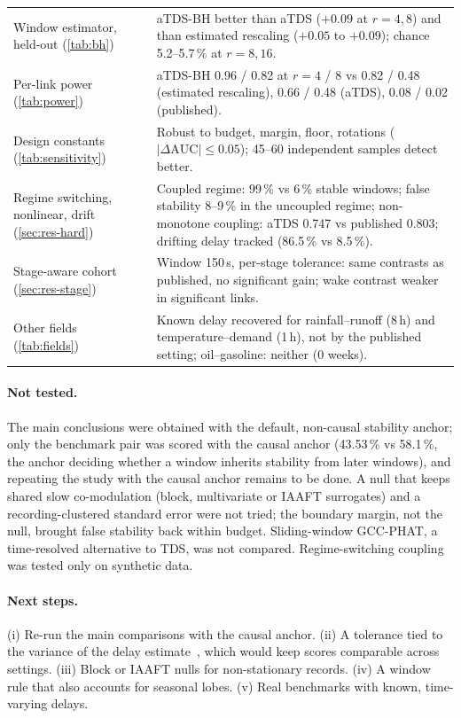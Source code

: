 \documentclass[11pt,a4paper]{article}
\begin{document}
\begin{table}[t]
\begin{tabularx}{\textwidth}{>{\raggedright\arraybackslash}p{4.2cm}>{\raggedright\arraybackslash}X}
Window estimator, held-out (\cref{tab:bh}) & aTDS-BH better than aTDS ($+0.09$ at $r = 4, 8$) and than estimated rescaling ($+0.05$ to $+0.09$); chance 5.2--5.7\,\% at $r = 8, 16$. \\
Per-link power (\cref{tab:power}) & aTDS-BH 0.96 / 0.82 at $r = 4$ / 8 vs 0.82 / 0.48 (estimated rescaling), 0.66 / 0.48 (aTDS), 0.08 / 0.02 (published). \\
Design constants (\cref{tab:sensitivity}) & Robust to budget, margin, floor, rotations ($|\Delta\mathrm{AUC}| \le 0.05$); 45--60 independent samples detect better. \\
Regime switching, nonlinear, drift (\cref{sec:res-hard}) & Coupled regime: 99\,\% vs 6\,\% stable windows; false stability 8--9\,\% in the uncoupled regime; non-monotone coupling: aTDS 0.747 vs published 0.803; drifting delay tracked (86.5\,\% vs 8.5\,\%). \\
Stage-aware cohort (\cref{sec:res-stage}) & Window 150\,s, per-stage tolerance: same contrasts as published, no significant gain; wake contrast weaker in significant links. \\
Other fields (\cref{tab:fields}) & Known delay recovered for rainfall--runoff (8\,h) and temperature--demand (1\,h), not by the published setting; oil--gasoline: neither (0 weeks). \\
\bottomrule
\end{tabularx}
\end{table}

\paragraph{Not tested.} The main conclusions were obtained with the default, non-causal stability anchor; only the benchmark pair was scored with the causal anchor (43.53\,\% vs 58.1\,\%, the anchor deciding whether a window inherits stability from later windows), and repeating the study with the causal anchor remains to be done. A null that keeps shared slow co-modulation (block, multivariate or IAAFT surrogates) and a recording-clustered standard error were not tried; the boundary margin, not the null, brought false stability back within budget. Sliding-window GCC-PHAT, a time-resolved alternative to TDS, was not compared. Regime-switching coupling was tested only on synthetic data.

\paragraph{Next steps.} (i) Re-run the main comparisons with the causal anchor. (ii) A tolerance tied to the variance of the delay estimate~\cite{Carter1987CoherenceTime}, which would keep scores comparable across settings. (iii) Block or IAAFT nulls for non-stationary records. (iv) A window rule that also accounts for seasonal lobes. (v) Real benchmarks with known, time-varying delays.
\end{document}
